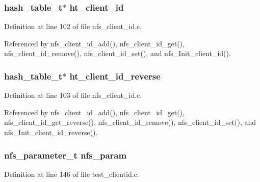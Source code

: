 \subsubsection{\setlength{\rightskip}{0pt plus 5cm}hash\_\-table\_\-t$\ast$ {\bf ht\_\-client\_\-id}}\label{nfs__client__id_8c_a0}




Definition at line 102 of file nfs\_\-client\_\-id.c.

Referenced by nfs\_\-client\_\-id\_\-add(), nfs\_\-client\_\-id\_\-get(), nfs\_\-client\_\-id\_\-remove(), nfs\_\-client\_\-id\_\-set(), and nfs\_\-Init\_\-client\_\-id().
\subsubsection{\setlength{\rightskip}{0pt plus 5cm}hash\_\-table\_\-t$\ast$ {\bf ht\_\-client\_\-id\_\-reverse}}\label{nfs__client__id_8c_a1}




Definition at line 103 of file nfs\_\-client\_\-id.c.

Referenced by nfs\_\-client\_\-id\_\-add(), nfs\_\-client\_\-id\_\-get(), nfs\_\-client\_\-id\_\-get\_\-reverse(), nfs\_\-client\_\-id\_\-remove(), nfs\_\-client\_\-id\_\-set(), and nfs\_\-Init\_\-client\_\-id\_\-reverse().
\subsubsection{\setlength{\rightskip}{0pt plus 5cm}nfs\_\-parameter\_\-t {\bf nfs\_\-param}}\label{nfs__client__id_8c_a2}




Definition at line 146 of file test\_\-clientid.c.